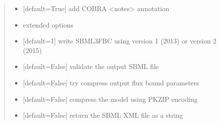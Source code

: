 \documentclass[letterpaper,12pt,english]{sphinxmanual}
\begin{document}
\begin{fulllineitems}
\begin{quote}
\begin{description}
\begin{itemize}
\item {} 
\sphinxAtStartPar
{} \textendash{} {[}default=True{]} add COBRA \textless{}notes\textgreater{} annotation

\item {} 
\sphinxAtStartPar
{} \textendash{} extended options

\item {} 
\sphinxAtStartPar
{} \textendash{} {[}default=1{]} write SBML3FBC using version 1 (2013) or version 2 (2015)

\item {} 
\sphinxAtStartPar
{} \textendash{} {[}default=False{]} validate the output SBML file

\item {} 
\sphinxAtStartPar
{} \textendash{} {[}default=False{]} try compress output flux bound parameters

\item {} 
\sphinxAtStartPar
{} \textendash{} {[}default=False{]} compress the model using PKZIP encoding

\item {} 
\sphinxAtStartPar
{} \textendash{} {[}default=False{]} return the SBML XML file as a string

\end{itemize}

\end{description}\end{quote}

\end{fulllineitems}
\end{document}
